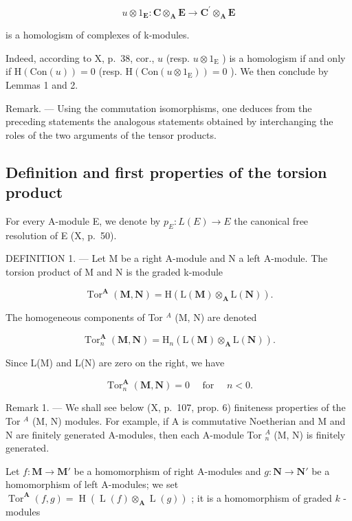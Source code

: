 \[
u \otimes 1 _ {\mathbf {E}}: \mathbf {C} \otimes_ {\mathbf {A}} \mathbf {E} \rightarrow \mathbf {C} ^ {\prime} \otimes_ {\mathbf {A}} \mathbf {E}
\]

is a homologism of complexes of k-modules.

Indeed, according to X, p.~38, cor., \(u\) (resp. \(u \otimes 1_{\mathrm{E}}\) ) is a homologism if and only if \(\mathrm{H}(\mathrm{Con}(u)) = 0\) (resp. \(\mathrm{H}(\mathrm{Con}(u \otimes 1_{\mathrm{E}})) = 0\) ). We then conclude by Lemmas 1 and 2.

Remark. --- Using the commutation isomorphisms, one deduces from the preceding statements the analogous statements obtained by interchanging the roles of the two arguments of the tensor products.

\subsection{Definition and first properties of the torsion product}

For every A-module E, we denote by \(p_{E}: L(E) \to E\) the canonical free resolution of E (X, p.~50).

DEFINITION 1. --- Let M be a right A-module and N a left A-module. The torsion product of M and N is the graded k-module

\[
\operatorname{Tor} ^ {\mathbf {A}} (\mathbf {M}, \mathbf {N}) = \mathrm{H} (\mathrm{L} (\mathbf {M}) \otimes_ {\mathbf {A}} \mathrm{L} (\mathbf {N}))  .\tag{4}
\]

The homogeneous components of Tor \(^{A}\) (M, N) are denoted

\[
\operatorname{Tor} _ {n} ^ {\mathbf {A}} (\mathbf {M}, \mathbf {N}) = \mathrm{H} _ {n} (\mathrm{L} (\mathbf {M}) \otimes_ {\mathbf {A}} \mathrm{L} (\mathbf {N})).\tag{5}
\]

Since L(M) and L(N) are zero on the right, we have

\[
\operatorname{Tor} _ {n} ^ {\mathbf {A}} (\mathbf {M}, \mathbf {N}) = 0 \quad \text { for } \quad n <   0.\tag{6}
\]

Remark 1. --- We shall see below (X, p.~107, prop. 6) finiteness properties of the Tor \(^{A}\) (M, N) modules. For example, if A is commutative Noetherian and M and N are finitely generated A-modules, then each A-module Tor \(_{n}^{A}\) (M, N) is finitely generated.

Let \(f: \mathbf{M} \to \mathbf{M}'\) be a homomorphism of right A-modules and \(g: \mathbf{N} \to \mathbf{N}'\) be a homomorphism of left A-modules; we set \(\operatorname{Tor}^{\mathbf{A}}(f, g) = \operatorname{H}\left(\operatorname{L}(f) \otimes_{\mathbf{A}} \operatorname{L}(g)\right)\) ; it is a homomorphism of graded \(k\) -modules

